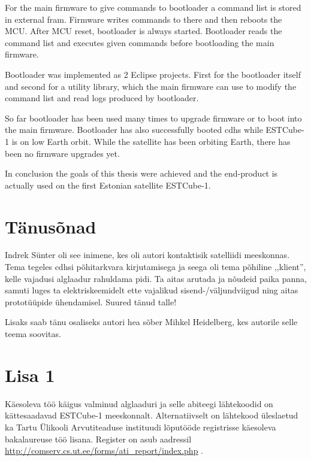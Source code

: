 \documentclass[12pt,a4paper]{article}
\begin{document}
For the main firmware to give commands to bootloader a command list is stored in
external \gls{fram}. Firmware writes commands to there and then reboots the MCU.
After MCU reset, bootloader is always started. Bootloader reads the command
list and executes given commands before bootloading the main firmware.

Bootloader was implemented as 2 Eclipse projects. First for the bootloader itself
and second for a utility library, which the main firmware can use to modify the
command list and read logs produced by bootloader.

So far bootloader has been used many times to upgrade firmware or to boot into
the main firmware. Bootloader has also successfully booted \gls{cdhs} while
ESTCube-1 is on low Earth orbit. While the satellite has been orbiting Earth,
there has been no firmware upgrades yet.

In conclusion the goals of this thesis were achieved and the end-product is
actually used on the first Estonian satellite ESTCube-1.
\newpage

\section*{Tänusõnad}
Indrek Sünter oli see inimene, kes oli autori kontaktisik satelliidi meeskonnas.
Tema tegeles \gls{cdhs}i põhitarkvara kirjutamisega ja seega oli tema põhiline
,,klient'', kelle vajadusi alglaadur rahuldama pidi. Ta aitas arutada ja nõudeid
paika panna, samuti luges ta elektriskeemidelt ette vajalikud
sisend-/väljund\-viigud ning aitas prototüüpide ühendamisel. Suured tänud talle!

Lisaks saab tänu osaliseks autori hea sõber Mihkel Heidelberg, kes autorile selle
teema soovitas.

\newpage
{}
{}
\label{viited}



\section*{Lisa 1}
Käesoleva töö käigus valminud alglaaduri ja selle abiteegi lähtekoodid on
kättesaadavad ESTCube-1 meeskonnalt. Alternatiivselt on lähtekood üleslaetud ka
Tartu Ülikooli Arvutiteaduse instituudi lõputööde registrisse käesoleva
bakalaureuse töö lisana. Register on asub aadressil
\url{http://comserv.cs.ut.ee/forms/ati\_report/index.php} .
\end{document}
